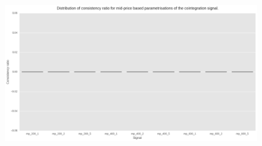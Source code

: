 \begin{figure}[H]
    \centering
    \includegraphics[width=\figwidth]{img/sp_nodelay_cr.png}

    \caption{}\label{fig:sp_nodelay:cr}
\end{figure}
